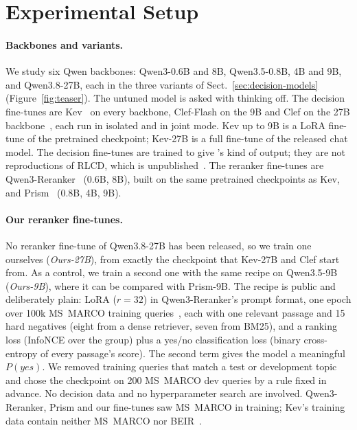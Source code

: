 \section{Experimental Setup}
\label{sec:setup}

\paragraph{Backbones and variants.}
We study six Qwen backbones: Qwen3-0.6B and 8B, Qwen3.5-0.8B, 4B and 9B, and Qwen3.8-27B, each in the three variants
of Sect.~\ref{sec:decision-models} (Figure~\ref{fig:teaser}). The untuned model is asked with thinking off. The
decision fine-tunes are Kev~\cite{Kev,KevCards} on every backbone, Clef-Flash on the 9B and Clef on the 27B
backbone~\cite{Clef}, each run in isolated and in joint mode. Kev up to 9B is a LoRA fine-tune of the pretrained
checkpoint; Kev-27B is a full fine-tune of the released chat model. The decision fine-tunes are trained to give
\jev{}'s kind of output; they are not reproductions of RLCD, which is unpublished~\cite{KevCards}. The reranker
fine-tunes are Qwen3-Reranker~\cite{Zhang2025Qwen3Embedding} (0.6B, 8B), built on the same pretrained checkpoints as
Kev, and Prism~\cite{Zhang2026Prism} (0.8B, 4B, 9B).

\paragraph{Our reranker fine-tunes.}
No reranker fine-tune of Qwen3.8-27B has been released, so we train one ourselves (\emph{Ours-27B}), from exactly the
checkpoint that Kev-27B and Clef start from. As a control, we train a second one with the same recipe on Qwen3.5-9B
(\emph{Ours-9B}), where it can be compared with Prism-9B. The recipe is public and deliberately plain: LoRA ($r=32$)
in Qwen3-Reranker's prompt format, one epoch over 100k MS~MARCO training queries~\cite{Nguyen2016MSMARCO}, each with
one relevant passage and 15 hard negatives (eight from a dense retriever, seven from BM25), and a ranking loss
(InfoNCE over the group) plus a yes/no classification loss (binary cross-entropy of every passage's score). The second
term gives the model a meaningful $P(\textit{yes})$. We removed training queries that match a test or development
topic and chose the checkpoint on 200 MS~MARCO dev queries by a rule fixed in advance. No decision data and no
hyperparameter search are involved. Qwen3-Reranker, Prism and our fine-tunes saw MS~MARCO in training; Kev's training
data contain neither MS~MARCO nor BEIR~\cite{KevCards}.

